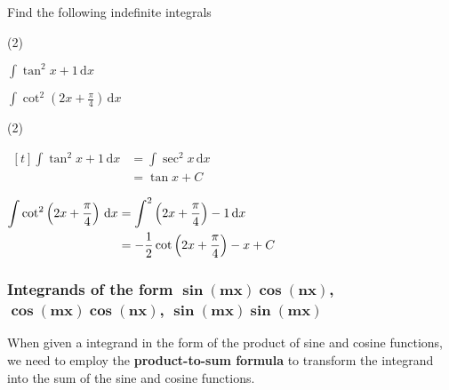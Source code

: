 \documentclass[11pt,a4paper]{book}
\let\csc\relax
\DeclareMathOperator{\csc}{cosec}
\begin{document}
\begin{example}

Find the following indefinite integrals


\begin{tasks}[label=(\alph*),label-width=3.5ex](2)


\task ${\displaystyle \int\tan^{2}x+1\, \mathrm{d}x}$

\task ${\displaystyle \int\cot^{2}\left(2x+\frac{\pi}{4}\right)\, \mathrm{d}x}$

\end{tasks}

\Solution

\begin{tasks}[label=(\alph*),label-width=3.5ex](2)

\task
$
\begin{aligned}[t]
{\displaystyle \int\tan^{2}x+1\, \mathrm{d}x} & =\int\sec^{2}x\, \mathrm{d}x\\
 & =\tan x+C
\end{aligned}
$

\task
$
\begin{aligned}[t]
\int\cot^{2}\left(2x+\frac{\pi}{4}\right)\, \mathrm{d}x & =\int\csc^{2}\left(2x+\frac{\pi}{4}\right)-1\, \mathrm{d}x\\
 & =-\frac{1}{2}\cot\left(2x+\frac{\pi}{4}\right)-x+C
\end{aligned}
$

\end{tasks}

\end{example}


\newpage{}

\subsubsection{Integrands of the form $\boldsymbol{\sin\left(mx\right)\cos\left(nx\right)}$,
$\boldsymbol{\cos\left(mx\right)\cos\left(nx\right)}$, $\boldsymbol{\sin\left(mx\right)\sin\left(mx\right)}$}

When given a integrand in the form of the product of sine and cosine
functions, we need to employ the \textbf{product-to-sum formula} to
transform the integrand into the sum of the sine and cosine functions.
\end{document}
